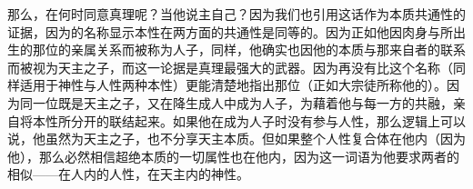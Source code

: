 那么，在何时同意真理呢？当他说主自己？因为我们也引用这话作为本质共通性的证据，因为的名称显示本性在两方面的共通性是同等的。因为正如他因肉身与所出生的那位的亲属关系而被称为人子，同样，他确实也因他的本质与那来自者的联系而被视为天主之子，而这一论据是真理最强大的武器。因为再没有比这个名称（同样适用于神性与人性两种本性）更能清楚地指出那位（正如大宗徒所称他的）。因为同一位既是天主之子，又在降生成人中成为人子，为藉着他与每一方的共融，亲自将本性所分开的联结起来。如果他在成为人子时没有参与人性，那么逻辑上可以说，他虽然为天主之子，也不分享天主本质。但如果整个人性复合体在他内（因为他），那么必然相信超绝本质的一切属性也在他内，因为这一词语为他要求两者的相似——在人内的人性，在天主内的神性。\par

